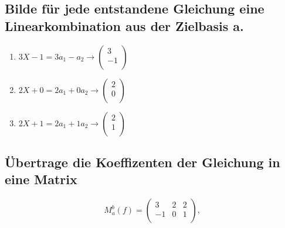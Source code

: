 \documentclass[12pt]{article}
\begin{document}
    \subsection{Bilde für jede entstandene Gleichung eine Linearkombination aus der Zielbasis a.}

    \begin{enumerate}
        \item $3X -1=3a_1-a_2\rightarrow\begin{pmatrix} 3\\-1\\\end{pmatrix}$
        \item $2X +0=2a_1+0a_2\rightarrow\begin{pmatrix} 2\\0\\\end{pmatrix}$
        \item $2X +1=2a_1+1a_2\rightarrow\begin{pmatrix} 2\\1\\\end{pmatrix}$
    \end{enumerate}


    \subsection{Übertrage die Koeffizenten der Gleichung in eine Matrix}

    \[M^{b}_a(f)=\begin{pmatrix} 3&2&2\\-1&0&1\\\end{pmatrix},\]
\end{document}
